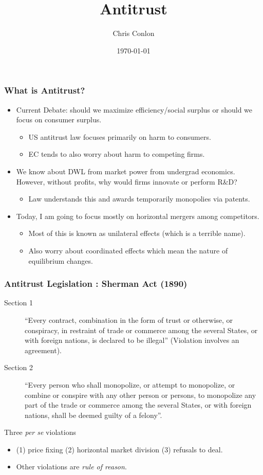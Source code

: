 \documentclass[xcolor=pdftex,dvipsnames,table,mathserif,aspectratio=169]{beamer}
\begin{document}
\title{Antitrust}
\author{Chris Conlon}
\date{\today}

\frame{\titlepage}

\begin{frame}
\frametitle{What is Antitrust?}
 \begin{itemize}
\item Current Debate: should we maximize \alert{efficiency/social surplus} or should we focus on \alert{consumer surplus}.
\begin{itemize}
\item US antitrust law focuses primarily on harm to consumers.
\item EC tends to also worry about harm to competing firms.
 \end{itemize}
 \item We know about DWL from market power from undergrad economics. However, without profits, why would firms innovate or perform R\&D?
 \begin{itemize}
\item Law understands this and awards temporarily monopolies via patents.
 \end{itemize}
\item Today, I am going to focus mostly on \alert{horizontal mergers} among competitors.
\begin{itemize}
\item Most of this is known as \alert{unilateral effects} (which is a terrible name).
\item Also worry about \alert{coordinated effects} which mean the nature of equilibrium changes.
 \end{itemize}
 \end{itemize}
\end{frame}

\begin{frame}
\frametitle{Antitrust Legislation : Sherman Act (1890)}
 \begin{description}
\item [Section 1]``Every contract, combination in the form of trust or otherwise, or conspiracy, in restraint of trade or commerce among the several States, or with foreign nations, is declared to be illegal'' (Violation involves an \alert{agreement}).
\item [Section 2] ``Every person who shall monopolize, or attempt to monopolize, or combine or conspire with any other person or persons, to monopolize any part of the trade or commerce among the several States, or with foreign nations, shall be deemed guilty of a felony''.
 \end{description}
 Three \textit{per se} violations
 \begin{itemize}
 \item (1) price fixing (2) horizontal market division (3) refusals to deal.
 \item Other violations are \textit{rule of reason}.
 \end{itemize}
 
\end{frame}
\end{document}
